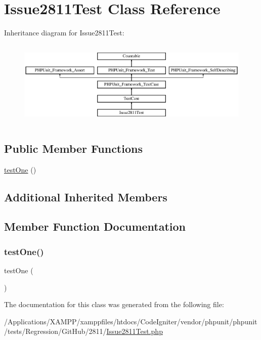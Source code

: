 \hypertarget{class_issue2811_test}{}\section{Issue2811\+Test Class Reference}
\label{class_issue2811_test}
Inheritance diagram for Issue2811\+Test\+:\begin{figure}[H]
\begin{center}
\leavevmode
\includegraphics[height=4.129793cm]{class_issue2811_test}
\end{center}
\end{figure}
\subsection*{Public Member Functions}
\begin{DoxyCompactItemize}
\item 
\mbox{\hyperlink{class_issue2811_test_afbf3ff88b322c6a7197ce02297cd23a0}{test\+One}} ()
\end{DoxyCompactItemize}
\subsection*{Additional Inherited Members}


\subsection{Member Function Documentation}
\mbox{\label{class_issue2811_test_afbf3ff88b322c6a7197ce02297cd23a0}} 
\subsubsection{\texorpdfstring{test\+One()}{testOne()}}
{\footnotesize\ttfamily test\+One (\begin{DoxyParamCaption}{ }\end{DoxyParamCaption})}



The documentation for this class was generated from the following file\+:\begin{DoxyCompactItemize}
\item 
/\+Applications/\+X\+A\+M\+P\+P/xamppfiles/htdocs/\+Code\+Igniter/vendor/phpunit/phpunit/tests/\+Regression/\+Git\+Hub/2811/\mbox{\hyperlink{_issue2811_test_8php}{Issue2811\+Test.\+php}}\end{DoxyCompactItemize}
